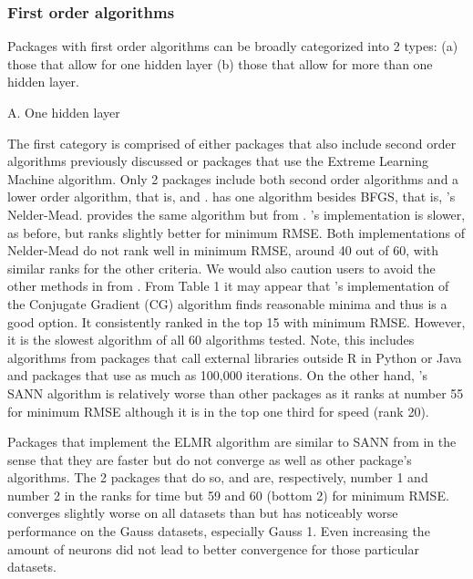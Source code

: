 \hypertarget{first-order-algorithms}{%
\subsubsection{First order algorithms}\label{first-order-algorithms}}

Packages with first order algorithms can be broadly categorized into 2
types: (a) those that allow for one hidden layer (b) those that allow
for more than one hidden layer.

A. One hidden layer

The first category is comprised of either packages that also include
second order algorithms previously discussed or packages that use the
Extreme Learning Machine algorithm. Only 2 packages include both second
order algorithms and a lower order algorithm, that is, 
and .  has one algorithm besides BFGS,
that is, 's Nelder-Mead.  provides the
same algorithm but from . 's
implementation is slower, as before, but ranks slightly better for
minimum RMSE. Both implementations of Nelder-Mead do not rank well in
minimum RMSE, around 40 out of 60, with similar ranks for the other
criteria. We would also caution users to avoid the other methods in
 from . From Table 1 it may appear that
's implementation of the Conjugate Gradient (CG)
algorithm finds reasonable minima and thus is a good option. It
consistently ranked in the top 15 with minimum RMSE. However, it is the
slowest algorithm of all 60 algorithms tested. Note, this includes
algorithms from packages that call external libraries outside R in
Python or Java and packages that use as much as 100,000 iterations. On
the other hand, 's SANN algorithm is relatively worse
than other packages as it ranks at number 55 for minimum RMSE although
it is in the top one third for speed (rank 20).

Packages that implement the ELMR algorithm are similar to SANN from
 in the sense that they are faster but do not converge
as well as other package's algorithms. The 2 packages that do so,
 \citep{R-elmNNRcpp} and 
\citep{R-ELMR} are, respectively, number 1 and number 2 in the ranks for
time but 59 and 60 (bottom 2) for minimum RMSE.  converges
slightly worse on all datasets than  but has
noticeably worse performance on the Gauss datasets, especially Gauss 1.
Even increasing the amount of neurons did not lead to better convergence
for those particular datasets.

